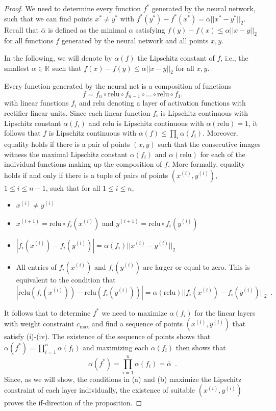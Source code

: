\documentclass{article} %
\newcommand{\RR}[1][]{\mathbb{R}^{#1}}
\newcommand{\norm}[1]{||{#1}||_2}
\newcommand{\relu}{\text{relu}}
\begin{document}
\begin{proof}
We need to determine every function $f^*$ generated by the neural network, such that we can find points $x^*\neq y^*$ with $f^*(y^*)-f^*(x^*)= \bar{\alpha}\norm{x^*-y^*}$. Recall that $\bar{\alpha}$ is defined as the minimal $\alpha$ satisfying $f(y)-f(x)\leq \alpha \norm{x-y}$ for all functions $f$ generated by the neural network and all points $x,y$.

In the following, we will denote by $\alpha (f)$ the Lipschitz constant of $f$, i.e., the smallest $\alpha \in \RR$ such that $f(x)-f(y)\leq \alpha \norm{x-y}$ for all $x,y$.

Every function generated by the neural net is a composition of functions $$f=f_n\circ \relu \circ f_{n-1}\circ \ldots \circ \relu \circ f_1.$$ with linear functions $f_i$ and $\relu$ denoting a layer of activation functions with rectifier linear units. Since each linear function $f_i$ is Lipschitz continuous with Lipschitz constant $\alpha(f_i)$ and $\relu$ is Lipschitz continuous with $\alpha(\relu)=1$, it follows that $f$ is Lipschitz continuous with $\alpha(f)\leq \prod_i \alpha(f_i)$. Moreover, equality holds if there is a pair of points $(x,y)$ such that the consecutive images witness the maximal Lipschitz constant $\alpha(f_i)$ and $\alpha(\relu)$ for each of the individual functions making up the composition of $f$. More formally, equality holds if and only if there is a tuple of pairs of points $(x^{(i)},y^{(i)})$, $1\leq i \leq n-1$, such that for all $1\leq i\leq n$, 
\begin{itemize}
\item[(i)] $x^{(i)}\neq y^{(i)}$
\item[(ii)] $x^{(i+1)}=\relu \circ f_i(x^{(i)})$ and $y^{(i+1)}=\relu \circ f_i(y^{(i)})$
\item[(iii)] $|f_i(x^{(i)})-f_i(y^{(i)})| = \alpha(f_i)\norm{x^{(i)}-y^{(i)}}$
\item[(iv)] All entries of $f_i(x^{(i)})$ and $f_i(y^{(i)})$ are larger or equal to zero. This is equivalent to the condition that $$|\relu(f_i(x^{(i)}))-\relu(f_i(y^{(i)}))| = \alpha(\relu)\norm{f_i(x^{(i)})-f_i(y^{(i)})}\enspace.$$
\end{itemize}
It follows that to determine $f^*$ we need to maximize $\alpha(f_i)$ for the linear layers with weight constraint $c_{\text{max}}$ and find a sequence of points $(x^{(i)},y^{(i)})$ that satisfy (i)-(iv). The existence of the sequence of points shows that $\alpha(f^*)=\prod_{i=1}^n \alpha(f_i)$ and maximizing each $\alpha(f_i)$ then shows that $$\alpha(f^*)=\prod_{i=1}^n \alpha(f_i)=\bar{\alpha}\enspace.$$
Since, as we will show, the conditions in (a) and (b) maximize the Lipschitz constraint of each layer individually, the existence of suitable $(x^{(i)},y^{(i)})$ proves the if-direction of the proposition.


\end{proof}
\end{document}
